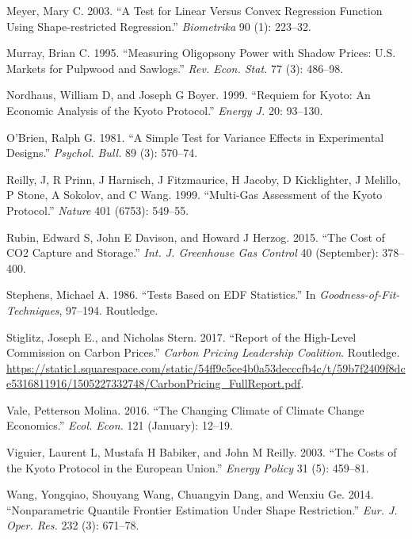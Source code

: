 \documentclass[
  10pt,
]{article}
\begin{document}
\leavevmode\hypertarget{ref-Meyer2003}{}%
Meyer, Mary C. 2003. ``A Test for Linear Versus Convex Regression
Function Using Shape‐restricted Regression.'' \emph{Biometrika} 90 (1):
223--32.

\leavevmode\hypertarget{ref-Murray1995}{}%
Murray, Brian C. 1995. ``Measuring Oligopsony Power with Shadow Prices:
U.S. Markets for Pulpwood and Sawlogs.'' \emph{Rev. Econ. Stat.} 77 (3):
486--98.

\leavevmode\hypertarget{ref-Nordhaus1999}{}%
Nordhaus, William D, and Joseph G Boyer. 1999. ``Requiem for Kyoto: An
Economic Analysis of the Kyoto Protocol.'' \emph{Energy J.} 20: 93--130.

\leavevmode\hypertarget{ref-OBrien1981}{}%
O'Brien, Ralph G. 1981. ``A Simple Test for Variance Effects in
Experimental Designs.'' \emph{Psychol. Bull.} 89 (3): 570--74.

\leavevmode\hypertarget{ref-Reilly1999}{}%
Reilly, J, R Prinn, J Harnisch, J Fitzmaurice, H Jacoby, D Kicklighter,
J Melillo, P Stone, A Sokolov, and C Wang. 1999. ``Multi-Gas Assessment
of the Kyoto Protocol.'' \emph{Nature} 401 (6753): 549--55.

\leavevmode\hypertarget{ref-Rubin2015}{}%
Rubin, Edward S, John E Davison, and Howard J Herzog. 2015. ``The Cost
of CO2 Capture and Storage.'' \emph{Int. J. Greenhouse Gas Control} 40
(September): 378--400.

\leavevmode\hypertarget{ref-Stephens1986}{}%
Stephens, Michael A. 1986. ``Tests Based on EDF Statistics.'' In
\emph{Goodness-of-Fit-Techniques}, 97--194. Routledge.

\leavevmode\hypertarget{ref-CPLC2017}{}%
Stiglitz, Joseph E., and Nicholas Stern. 2017. ``Report of the
High-Level Commission on Carbon Prices.'' \emph{Carbon Pricing
Leadership Coalition}. Routledge.
\url{https://static1.squarespace.com/static/54ff9c5ce4b0a53decccfb4c/t/59b7f2409f8dce5316811916/1505227332748/CarbonPricing_FullReport.pdf}.

\leavevmode\hypertarget{ref-Vale2016}{}%
Vale, Petterson Molina. 2016. ``The Changing Climate of Climate Change
Economics.'' \emph{Ecol. Econ.} 121 (January): 12--19.

\leavevmode\hypertarget{ref-Viguier2003}{}%
Viguier, Laurent L, Mustafa H Babiker, and John M Reilly. 2003. ``The
Costs of the Kyoto Protocol in the European Union.'' \emph{Energy
Policy} 31 (5): 459--81.

\leavevmode\hypertarget{ref-Wang2014}{}%
Wang, Yongqiao, Shouyang Wang, Chuangyin Dang, and Wenxiu Ge. 2014.
``Nonparametric Quantile Frontier Estimation Under Shape Restriction.''
\emph{Eur. J. Oper. Res.} 232 (3): 671--78.
\end{document}
